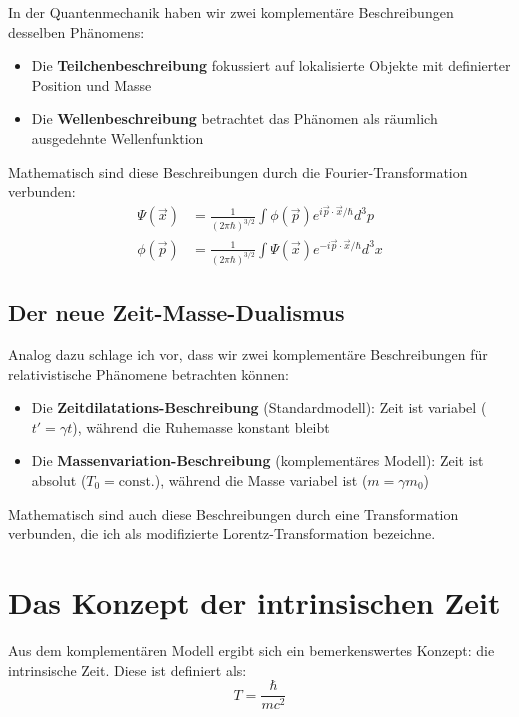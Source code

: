 \documentclass[a4paper,12pt]{article}
\begin{document}
	In der Quantenmechanik haben wir zwei komplementäre Beschreibungen desselben Phänomens:
	
	\begin{itemize}
		\item Die \textbf{Teilchenbeschreibung} fokussiert auf lokalisierte Objekte mit definierter Position und Masse
		\item Die \textbf{Wellenbeschreibung} betrachtet das Phänomen als räumlich ausgedehnte Wellenfunktion
	\end{itemize}
	
	Mathematisch sind diese Beschreibungen durch die Fourier-Transformation verbunden:
	\begin{align}
		\Psi(\vec{x}) &= \frac{1}{(2\pi\hbar)^{3/2}} \int \phi(\vec{p}) e^{i\vec{p}\cdot\vec{x}/\hbar} d^3p \\
		\phi(\vec{p}) &= \frac{1}{(2\pi\hbar)^{3/2}} \int \Psi(\vec{x}) e^{-i\vec{p}\cdot\vec{x}/\hbar} d^3x
	\end{align}
	
	\subsection{Der neue Zeit-Masse-Dualismus}
	
	Analog dazu schlage ich vor, dass wir zwei komplementäre Beschreibungen für relativistische Phänomene betrachten können:
	
	\begin{itemize}
		\item Die \textbf{Zeitdilatations-Beschreibung} (Standardmodell): Zeit ist variabel ($t' = \gamma t$), während die Ruhemasse konstant bleibt
		\item Die \textbf{Massenvariation-Beschreibung} (komplementäres Modell): Zeit ist absolut ($T_0 = \text{const.}$), während die Masse variabel ist ($m = \gamma m_0$)
	\end{itemize}
	
	Mathematisch sind auch diese Beschreibungen durch eine Transformation verbunden, die ich als modifizierte Lorentz-Transformation bezeichne.
	
	\section{Das Konzept der intrinsischen Zeit}
	
	Aus dem komplementären Modell ergibt sich ein bemerkenswertes Konzept: die intrinsische Zeit. Diese ist definiert als:
	\begin{equation}
		T = \frac{\hbar}{mc^2}
	\end{equation}
	
\end{document}
